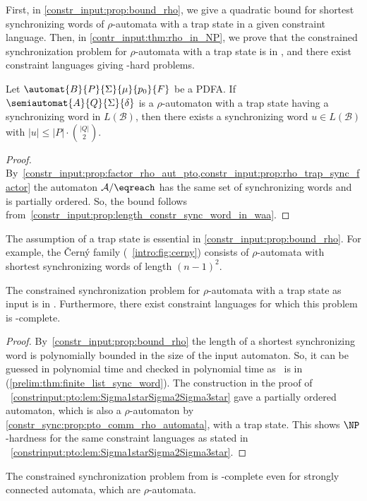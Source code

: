 
First, in \cref{constr_input:prop:bound_rho}, we give a quadratic bound
for shortest synchronizing words of $\rho$-automata with a trap state
in a given constraint language.
Then, in \cref{contr_input:thm:rho_in_NP}, we prove
that the constrained synchronization problem for $\rho$-automata
with a trap state is in \NP, and there exist constraint languages
giving \NP-hard problems.

\begin{proposition}
\label{constr_input:prop:bound_rho}
	Let $\automat{B}{P}{\Sigma}{\mu}{p_0}{F}$ be a PDFA.
	If $\semiautomat{A}{Q}{\Sigma}{\delta}$
	is a $\rho$-automaton with a trap state
    having a synchronizing word in $L(\mathcal B)$,
	then there exists a synchronizing word $u \in L(\mathcal B)$
	with $|u| \le |P| \cdot \binom{|Q|}{2}$.			
\end{proposition}
\begin{proof}
	By~\cref{constr_input:prop:factor_rho_aut_pto,constr_input:prop:rho_trap_sync_factor}
	the automaton $\mathcal A / {\eqreach}$
	has the same set of synchronizing words
	and is partially ordered. So, the bound
	follows from~\cref{constr_input:prop:length_constr_sync_word_in_waa}.
\end{proof} 
	
The assumption of a trap state
is essential in \cref{constr_input:prop:bound_rho}. For example,
the \v{C}ern\'y family (\FIG~\ref{intro:fig:cerny}) consists 
of $\rho$-automata with shortest synchronizing words of length $(n-1)^2$.

\begin{theorem}
\label{contr_input:thm:rho_in_NP}
	The constrained synchronization problem
	for $\rho$-automata with a trap state as input
	is in \NP. Furthermore, there exist constraint languages
	for which this problem is \NP-complete.
\end{theorem}
\begin{proof} 
	By~\cref{constr_input:prop:bound_rho}
	the length of a shortest synchronizing word is polynomially bounded
	in the size of the input automaton.
	So, it can be guessed in polynomial time
	and checked in polynomial time as \DFASW\ 
	is in \LOGSPACE (\cref{prelim:thm:finite_list_sync_word}).		
	The construction
	in the proof of \LEM~\ref{constrinput:pto:lem:Sigma1starSigma2Sigma3star}
	gave a partially ordered automaton, which is also a $\rho$-automaton by \cref{constr_sync:prop:pto_comm_rho_automata}, 
	with a trap state.
	This shows $\NP$-hardness for the same constraint languages
	as stated in \LEM~\ref{constrinput:pto:lem:Sigma1starSigma2Sigma3star}.
\end{proof}	

The constrained synchronization problem from  
is \PSPACE-complete even for strongly connected automata, which are $\rho$-automata.